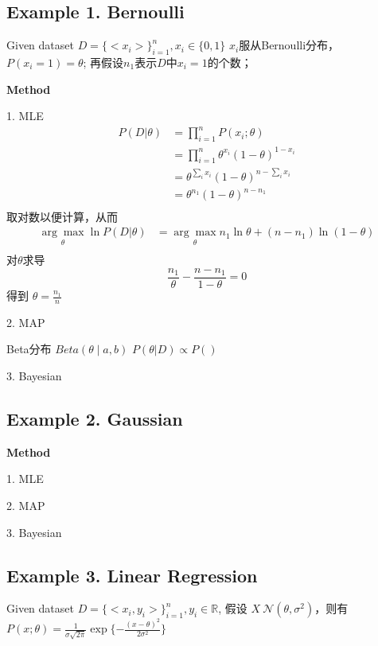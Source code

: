 \documentclass[UTF8]{ctexart}
\numberwithin{equation}{section}
\begin{document}
\subsection{Example 1. Bernoulli}
Given dataset $D=\{<x_i>\}_{i=1}^n, x_i \in \{0,1\}$
$x_i$服从Bernoulli分布，$P(x_i=1)=\theta$;
再假设$n_1$表示$D$中$x_i=1$的个数；

\textbf{Method}

1. MLE 
\begin{align*}
    P(D|\theta) &= \prod_{i=1}^n P(x_i; \theta) \\
    &= \prod_{i=1}^n \theta^{x_i} (1-\theta)^{1-x_i} \\
    &= \theta^{\sum_i x_i} (1-\theta)^{n-\sum_i x_i} \\
    &= \theta^{n_1} (1-\theta)^{n-n_1} \\
\end{align*}
取对数以便计算，从而
\begin{align*}
    \underset {\theta} {\arg \max} \ln P(D|\theta) &= \underset {\theta} {\arg \max} n_1 \ln \theta + (n-n_1) \ln (1-\theta) \\
\end{align*}
对$\theta$求导
\begin{equation*}
    \frac{n_1}{\theta} - \frac{n-n_1}{1-\theta} = 0
\end{equation*}
得到 $\theta = \frac{n_1}{n}$


2. MAP

Beta分布 $Beta(\theta \mid a, b)$
$P(\theta | D) \propto P()$ 

\begin{center} 
\end{center}

3. Bayesian


\subsection{Example 2. Gaussian}

\textbf{Method}

1. MLE 

2. MAP

3. Bayesian

\subsection{Example 3. Linear Regression}
Given dataset $D=\{<x_i, y_i>\}_{i=1}^n, y_i \in \mathbb{R}$,
假设 $X ~ \mathcal{N}(\theta, \sigma^2)$，则有
$P(x;\theta) = \frac{1}{\sigma \sqrt{2\pi}}\exp\{-\frac{(x-\theta)^2}{2\sigma^2}\}$
\end{document}
